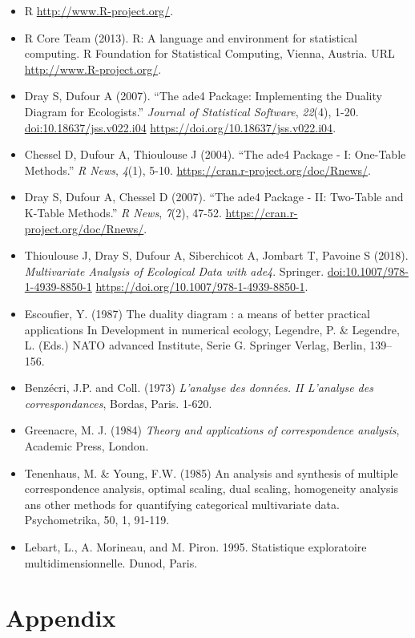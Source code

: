 \documentclass[
  10pt,
]{article}
\providecommand{\tightlist}{%
  \setlength{\itemsep}{0pt}\setlength{\parskip}{0pt}}
\begin{document}
\begin{itemize}
\tightlist
\item
  R \url{http://www.R-project.org/}.
\item
  R Core Team (2013). R: A language and environment for statistical
  computing. R Foundation for Statistical Computing, Vienna, Austria.
  URL \url{http://www.R-project.org/}.
\item
  Dray S, Dufour A (2007). ``The ade4 Package: Implementing the Duality
  Diagram for Ecologists.'' \emph{Journal of Statistical Software},
  \emph{22}(4), 1-20. \url{doi:10.18637/jss.v022.i04}
  \url{https://doi.org/10.18637/jss.v022.i04}.
\item
  Chessel D, Dufour A, Thioulouse J (2004). ``The ade4 Package - I:
  One-Table Methods.'' \emph{R News}, \emph{4}(1), 5-10.
  \url{https://cran.r-project.org/doc/Rnews/}.
\item
  Dray S, Dufour A, Chessel D (2007). ``The ade4 Package - II: Two-Table
  and K-Table Methods.'' \emph{R News}, \emph{7}(2), 47-52.
  \url{https://cran.r-project.org/doc/Rnews/}.
\item
  Thioulouse J, Dray S, Dufour A, Siberchicot A, Jombart T, Pavoine S
  (2018). \emph{Multivariate Analysis of Ecological Data with ade4}.
  Springer. \url{doi:10.1007/978-1-4939-8850-1}
  \url{https://doi.org/10.1007/978-1-4939-8850-1}.
\item
  Escoufier, Y. (1987) The duality diagram : a means of better practical
  applications In Development in numerical ecology, Legendre, P. \&
  Legendre, L. (Eds.) NATO advanced Institute, Serie G. Springer Verlag,
  Berlin, 139--156.
\item
  Benzécri, J.P. and Coll. (1973) \emph{L'analyse des données. II
  L'analyse des correspondances}, Bordas, Paris. 1-620.
\item
  Greenacre, M. J. (1984) \emph{Theory and applications of
  correspondence analysis}, Academic Press, London.
\item
  Tenenhaus, M. \& Young, F.W. (1985) An analysis and synthesis of
  multiple correspondence analysis, optimal scaling, dual scaling,
  homogeneity analysis ans other methods for quantifying categorical
  multivariate data. Psychometrika, 50, 1, 91-119.
\item
  Lebart, L., A. Morineau, and M. Piron. 1995. Statistique exploratoire
  multidimensionnelle. Dunod, Paris.
\end{itemize}

\section{Appendix}\label{appendix}
\end{document}
